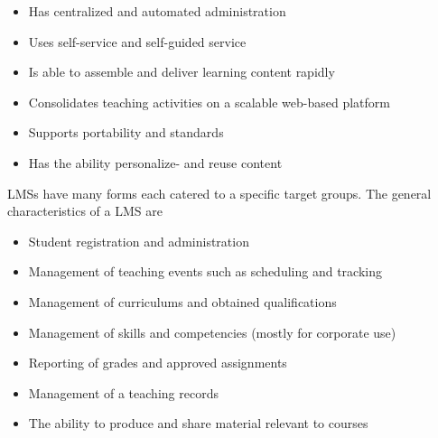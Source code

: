 \begin{itemize}
	\item Has centralized and automated administration
	\item Uses self-service and self-guided service
	\item Is able to assemble and deliver learning content rapidly
	\item Consolidates teaching activities on a scalable web-based platform
	\item Supports portability and standards
	\item Has the ability personalize- and reuse content
\end{itemize}

LMSs have many forms each catered to a specific target groups. 
The general characteristics of a LMS are~\citep{Kerschenbaum}

\begin{itemize}
	\item Student registration and administration
	\item Management of teaching events such as scheduling and tracking
	\item Management of curriculums and obtained qualifications
	\item Management of skills and competencies (mostly for corporate use)
	\item Reporting of grades and approved assignments
	\item Management of	a teaching records
	\item The ability to produce and share material relevant to courses

\end{itemize}

